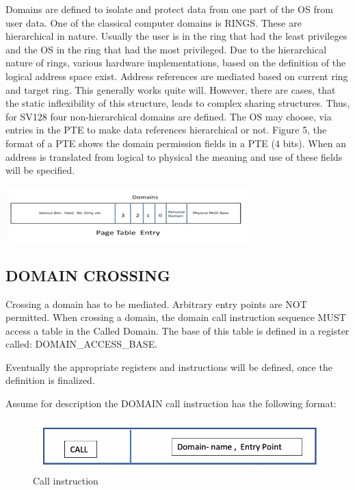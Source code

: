 \documentclass{article}
\begin{document}
Domains are defined to isolate and protect data from one part of the OS from user data.  One of the classical computer domains is RINGS.  These are hierarchical in nature.  Usually the user is in the ring that had the least privileges and the OS in the ring that had the most privileged.  Due to the hierarchical nature of rings,  various hardware implementations,  based on the definition of the logical address space exist.  Address references are mediated based on current   ring and target ring. This generally works quite will.  However, there are cases,  that the static inflexibility of this structure, leads to complex sharing structures.   Thus, for SV128 four non-hierarchical domains are defined. The OS may choose, via entries in the PTE to make data references hierarchical or not. Figure 5,  the format of a PTE shows the domain  permission fields in a PTE (4 bits).  When an address is translated from logical to physical the meaning and use of these fields will be specified.


\begin{center}
\includegraphics[scale = .9]
{figures/figure2b_pte.jpg}
\centering
\end{center}

\subsection{DOMAIN CROSSING}

Crossing a domain has to be mediated.  Arbitrary entry  points are NOT  permitted. When crossing a domain,  the domain call instruction sequence MUST access a table in the Called Domain. The base of this table is defined in a register called: DOMAIN\_ACCESS\_BASE. 

Eventually the appropriate registers and instructions will be defined, once the definition is finalized.


 Assume for description the DOMAIN call instruction has the following format:

\begin{figure}[h]
\includegraphics[scale=.4]{figures/figure3_call_instruction.jpg}
\caption{Call instruction}
\end{figure}
\end{document}
